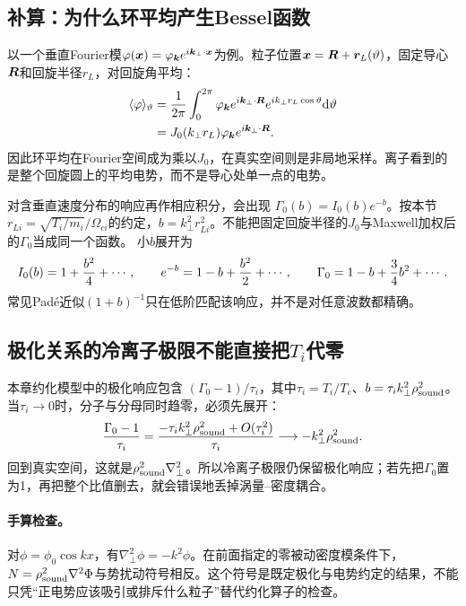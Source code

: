 \subsection{补算：为什么环平均产生Bessel函数}
以一个垂直Fourier模$\varphi(\bm{x})=\varphi_{\bm{k}}e^{i\bm{k}_\perp\cdot\bm{x}}$为例。粒子位置$\bm{x}=\bm{R}+\bm{r}_L(\vartheta)$，固定导心$\bm{R}$和回旋半径$r_L$，对回旋角平均：
\begin{align}
 \langle\varphi\rangle_\vartheta
 &={1\over2\pi}\int_0^{2\pi}
 \varphi_{\bm{k}}e^{i\bm{k}_\perp\cdot\bm{R}}
 e^{ik_\perp r_L\cos\vartheta}\mathrm d\vartheta\\
 &=J_0(k_\perp r_L)\varphi_{\bm{k}}e^{i\bm{k}_\perp\cdot\bm{R}}.
\end{align}
因此环平均在Fourier空间成为乘以$J_0$，在真实空间则是非局地采样。离子看到的是整个回旋圆上的平均电势，而不是导心处单一点的电势。

对含垂直速度分布的响应再作相应积分，会出现
$\Gamma_0(b)=I_0(b)e^{-b}$。按本节$r_{Li}=\sqrt{T_i/m_i}/\Omega_{ci}$的约定，$b=k_\perp^2r_{Li}^2$。不能把固定回旋半径的$J_0$与Maxwell加权后的$\Gamma_0$当成同一个函数。
小$b$展开为
\begin{equation}
 I_0(b)=1+{b^2\over4}+\cdots,\qquad
 e^{-b}=1-b+{b^2\over2}+\cdots,\qquad
 \Gamma_0=1-b+{3\over4}b^2+\cdots.
\end{equation}
常见Padé近似$(1+b)^{-1}$只在低阶匹配该响应，并不是对任意波数都精确。

\subsection{极化关系的冷离子极限不能直接把$T_i$代零}
本章约化模型中的极化响应包含
$ (\Gamma_0-1)/\tau_i$，其中$\tau_i=T_i/T_e$、$b=\tau_i k_\perp^2\rho_{\rm sound}^2$。当$\tau_i\to0$时，分子与分母同时趋零，必须先展开：
\begin{equation}
 {\Gamma_0-1\over\tau_i}
 ={ -\tau_i k_\perp^2\rho_{\rm sound}^2+O(\tau_i^2)\over\tau_i}
 \longrightarrow-k_\perp^2\rho_{\rm sound}^2.
\end{equation}
回到真实空间，这就是$\rho_{\rm sound}^2\nabla_\perp^2$。所以冷离子极限仍保留极化响应；若先把$\Gamma_0$置为1，再把整个比值删去，就会错误地丢掉涡量--密度耦合。

\paragraph{手算检查。}
对$\phi=\phi_0\cos kx$，有$\nabla_\perp^2\phi=-k^2\phi$。在前面指定的零被动密度模条件下，$N=\rho_{\rm sound}^2\nabla^2\Phi$与势扰动符号相反。这个符号是既定极化与电势约定的结果，不能只凭“正电势应该吸引或排斥什么粒子”替代约化算子的检查。
